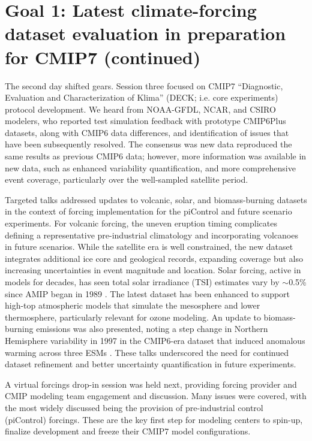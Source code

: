 \documentclass{ametsocV6.1}
\begin{document}
\section*{Goal 1: Latest climate-forcing dataset evaluation in preparation for CMIP7 (continued)}
The second day shifted gears. Session three focused on CMIP7 ``Diagnostic, Evaluation and Characterization of Klima'' (DECK; i.e. core experiments) protocol development. We heard from NOAA-GFDL, NCAR, and CSIRO modelers, who reported test simulation feedback with prototype CMIP6Plus datasets, along with CMIP6 data differences, and identification of issues that have been subsequently resolved. The consensus was new data reproduced the same results as previous CMIP6 data; however, more information was available in new data, such as enhanced variability quantification, and more comprehensive event coverage, particularly over the well-sampled satellite period.

Targeted talks addressed updates to volcanic, solar, and biomass-burning datasets in the context of forcing implementation for the piControl and future scenario experiments. For volcanic forcing, the uneven eruption timing complicates defining a representative pre-industrial climatology and incorporating volcanoes in future scenarios. While the satellite era is well constrained, the new dataset integrates additional ice core and geological records, expanding coverage but also increasing uncertainties in event magnitude and location. Solar forcing, active in models for decades, has seen total solar irradiance (TSI) estimates vary by $\sim$0.5\% since AMIP began in 1989 \citep{durack_coupled_2025}. The latest dataset has been enhanced to support high-top atmospheric models that simulate the mesosphere and lower thermosphere, particularly relevant for ozone modeling. An update to biomass-burning emissions was also presented, noting a step change in Northern Hemisphere variability in 1997 in the CMIP6-era dataset that induced anomalous warming across three ESMs \cite[e.g.,][]{fasullo_overview_2024,holland_new_2024}. These talks underscored the need for continued dataset refinement and better uncertainty quantification in future experiments.

A virtual forcings drop-in session was held next, providing forcing provider and CMIP modeling team engagement and discussion. Many issues were covered, with the most widely discussed being the provision of pre-industrial control (piControl) forcings. These are the key first step for modeling centers to spin-up, finalize development and freeze their CMIP7 model configurations.
\end{document}
